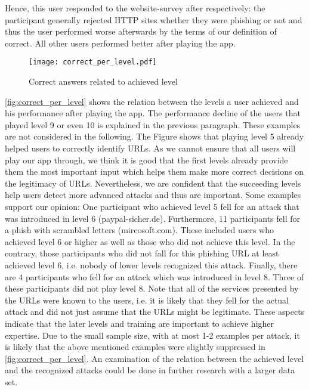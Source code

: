 \begin{description}[leftmargin=0cm]
	Hence, this user responded to the website-survey after respectively: the participant generally rejected HTTP sites whether they were phishing or not and thus the user performed worse afterwards by the terms of our definition of correct.
	All other users performed better after playing the app.
	\item[Relation Between Achieved Level and Identified Websites] 
		\begin{figure}
			\centering
			\texttt{[image: correct\_per\_level.pdf]}
			\caption{Correct answers related to achieved level}
			\label{fig:correct_per_level}
			\end{figure}
	\autoref{fig:correct_per_level} shows the relation between the levels a user achieved and his performance after playing the app. The performance decline of the users that played level 9 or even 10 is explained in the previous paragraph. These examples are not considered in the following. The Figure shows that playing level 5 already helped users to correctly identify URLs.
As we cannot ensure that all users will play our app through, we think it is good that the first levels already provide them the most important input which helps them make more correct decisions on the legitimacy of URLs. 
Nevertheless, we are confident that the succeeding levels help users detect more advanced attacks and thus are important. 
Some examples support our opinion: One participant who achieved level 5 fell for an attack that was introduced in level 6 (paypal-sicher.de). Furthermore, 11 participants fell for a phish with scrambled letters (mircosoft.com). These included users who achieved level 6 or higher as well as those who did not achieve this level. In the contrary, those participants who did not fall for this phishing URL at least achieved level 6, i.e. nobody of lower levels recognized this attack. 
	Finally, there are 4 participants who fell for an attack which was introduced in level 8. Three of these participants did not play level 8.
	Note that all of the services presented by the URLs were known to the users, i.e. it is likely that they fell for the actual attack and did not just assume that the URLs might be legitimate.
	These aspects indicate that the later levels and training are important to achieve higher expertise.
	Due to the small sample size, with at most 1-2 examples per attack, it is likely that the above mentioned examples were slightly suppressed in \autoref{fig:correct_per_level}.
	An examination of the relation between the achieved level and the recognized attacks could be done in further research with a larger data set.

\end{description}
